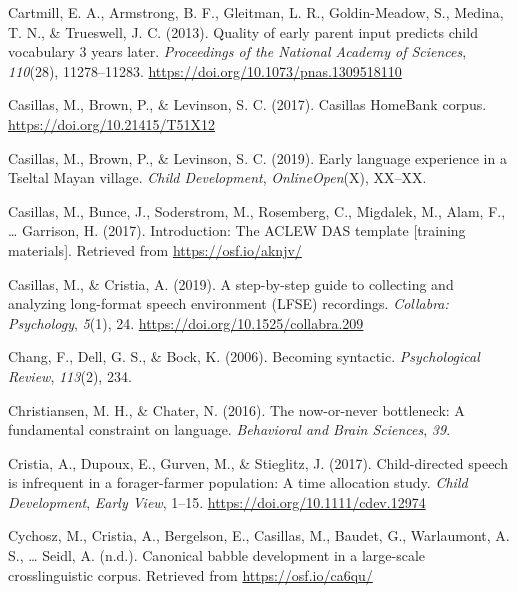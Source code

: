 \documentclass[
  english,
  ,man,floatsintext]{apa6}
\begin{document}
\leavevmode\hypertarget{ref-cartmill2013quality}{}%
Cartmill, E. A., Armstrong, B. F., Gleitman, L. R., Goldin-Meadow, S., Medina, T. N., \& Trueswell, J. C. (2013). Quality of early parent input predicts child vocabulary 3 years later. \emph{Proceedings of the National Academy of Sciences}, \emph{110}(28), 11278--11283. \url{https://doi.org/10.1073/pnas.1309518110}

\leavevmode\hypertarget{ref-Casillas-HB}{}%
Casillas, M., Brown, P., \& Levinson, S. C. (2017). Casillas HomeBank corpus. \url{https://doi.org/10.21415/T51X12}

\leavevmode\hypertarget{ref-casillas2019early}{}%
Casillas, M., Brown, P., \& Levinson, S. C. (2019). Early language experience in a Tseltal Mayan village. \emph{Child Development}, \emph{OnlineOpen}(X), XX--XX.

\leavevmode\hypertarget{ref-casillas2017ACLEWDAS}{}%
Casillas, M., Bunce, J., Soderstrom, M., Rosemberg, C., Migdalek, M., Alam, F., \ldots{} Garrison, H. (2017). Introduction: The ACLEW DAS template {[}training materials{]}. Retrieved from \url{https://osf.io/aknjv/}

\leavevmode\hypertarget{ref-casillas2019stepbystep}{}%
Casillas, M., \& Cristia, A. (2019). A step-by-step guide to collecting and analyzing long-format speech environment (LFSE) recordings. \emph{Collabra: Psychology}, \emph{5}(1), 24. \url{https://doi.org/10.1525/collabra.209}

\leavevmode\hypertarget{ref-chang2006becoming}{}%
Chang, F., Dell, G. S., \& Bock, K. (2006). Becoming syntactic. \emph{Psychological Review}, \emph{113}(2), 234.

\leavevmode\hypertarget{ref-christiansen2016now}{}%
Christiansen, M. H., \& Chater, N. (2016). The now-or-never bottleneck: A fundamental constraint on language. \emph{Behavioral and Brain Sciences}, \emph{39}.

\leavevmode\hypertarget{ref-cristia2017child}{}%
Cristia, A., Dupoux, E., Gurven, M., \& Stieglitz, J. (2017). Child-directed speech is infrequent in a forager-farmer population: A time allocation study. \emph{Child Development}, \emph{Early View}, 1--15. \url{https://doi.org/10.1111/cdev.12974}

\leavevmode\hypertarget{ref-cychoszURcanonical}{}%
Cychosz, M., Cristia, A., Bergelson, E., Casillas, M., Baudet, G., Warlaumont, A. S., \ldots{} Seidl, A. (n.d.). Canonical babble development in a large-scale crosslinguistic corpus. Retrieved from \url{https://osf.io/ca6qu/}
\end{document}
